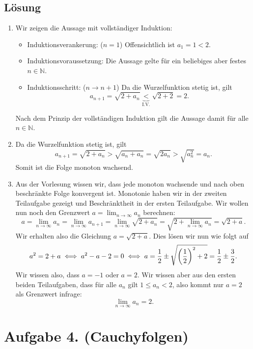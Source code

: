 \documentclass[german,12pt]{homework}
\newcommand{\NN}{\mathbb{N}}
\DeclarePairedDelimiter{\enbrace}{(}{)}
\begin{document}
    \subsection*{Lösung}
    \begin{enumerate}
        \item Wir zeigen die Aussage mit vollständiger Induktion:
        \begin{itemize}
            \item Induktionsverankerung: (\(n = 1\)) Offensichtlich ist \(a_1 = 1 < 2\).
            \item Induktionsvoraussetzung: Die Aussage gelte für ein beliebiges aber festes \(n \in \NN\).
            \item Induktionsschritt: (\(n \to n + 1\)) Da die Wurzelfunktion stetig ist, gilt
            \[a_{n + 1} = \sqrt{2 + a_n} \underbrace{<}_\text{I.V.} \sqrt{2 + 2} = 2.\]
        \end{itemize}
        Nach dem Prinzip der vollständigen Induktion gilt die Aussage damit für alle \(n \in \NN\).
        \item Da die Wurzelfunktion stetig ist, gilt
        \[a_{n + 1} = \sqrt{2 + a_n} > \sqrt{a_n + a_n} = \sqrt{2a_n} > \sqrt{a_n^2} = a_n.\]
        Somit ist die Folge monoton wachsend.
        \item Aus der Vorlesung wissen wir, dass jede monoton wachsende und nach oben beschränkte Folge konvergent ist. Monotonie haben wir in der zweiten Teilaufgabe gezeigt und Beschränktheit in der ersten Teilaufgabe. Wir wollen nun noch den Grenzwert \(a = \lim_{n \to \infty}a_n\) berechnen:
        \[a = \lim_{n \to \infty}a_n = \lim_{n \to \infty}a_{n + 1} = \lim_{n \to \infty}\sqrt{2 + a_n} = \sqrt{2 + \lim_{n \to \infty}a_n} = \sqrt{2 + a}.\]
        Wir erhalten also die Gleichung \(a = \sqrt{2 + a}\). Dies lösen wir nun wie folgt auf
        \[a^2 = 2 + a \iff a^2 - a - 2 = 0 \iff a = \frac{1}{2} \pm \sqrt{\enbrace*{\frac{1}{2}}^2 + 2} = \frac{1}{2} \pm \frac{3}{2}.\]
        Wir wissen also, dass \(a = -1\) oder \(a = 2\). Wir wissen aber aus den ersten beiden Teilaufgaben, dass für alle \(a_n\) gilt \(1 \le a_n < 2\), also kommt nur \(a = 2\) als Grenzwert infrage:
        \[\lim_{n \to \infty}a_n = 2.\]
    \end{enumerate}

    \section*{Aufgabe 4. (Cauchyfolgen)}
\end{document}
